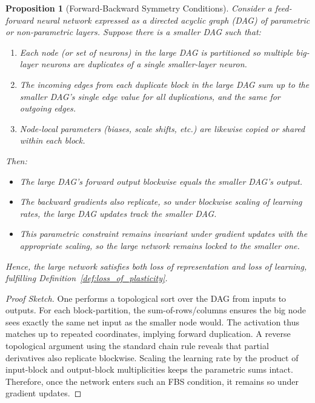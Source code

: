 \documentclass[11pt]{article}
\newtheorem{proposition}{Proposition}[section]
\begin{document}
\begin{proposition}[Forward-Backward Symmetry Conditions]
\label{prop:FBS_conditions}
Consider a feed-forward neural network expressed as a directed acyclic graph (DAG) of parametric or non-parametric layers. Suppose there is a smaller DAG such that:
\begin{enumerate}
    \item Each node (or set of neurons) in the large DAG is partitioned so multiple big-layer neurons are duplicates of a single smaller-layer neuron.
    \item The incoming edges from each duplicate block in the large DAG sum up to the smaller DAG's single edge value for all duplications, and the same for outgoing edges.
    \item Node-local parameters (biases, scale shifts, etc.) are likewise copied or shared within each block.
\end{enumerate}
Then:
\begin{itemize}
    \item The large DAG's forward output blockwise equals the smaller DAG's output.
    \item The backward gradients also replicate, so under blockwise scaling of learning rates, the large DAG updates track the smaller DAG.
    \item This parametric constraint remains invariant under gradient updates with the appropriate scaling, so the large network remains locked to the smaller one.
\end{itemize}
Hence, the large network satisfies both loss of representation and loss of learning, fulfilling Definition~\ref{def:loss_of_plasticity}.
\end{proposition}

\begin{proof}[Proof Sketch]
One performs a topological sort over the DAG from inputs to outputs. For each block-partition, the sum-of-rows/columns ensures the big node sees exactly the same net input as the smaller node would. The activation thus matches up to repeated coordinates, implying forward duplication. A reverse topological argument using the standard chain rule reveals that partial derivatives also replicate blockwise. Scaling the learning rate by the product of input-block and output-block multiplicities keeps the parametric sums intact. Therefore, once the network enters such an FBS condition, it remains so under gradient updates.
\end{proof}
\end{document}
